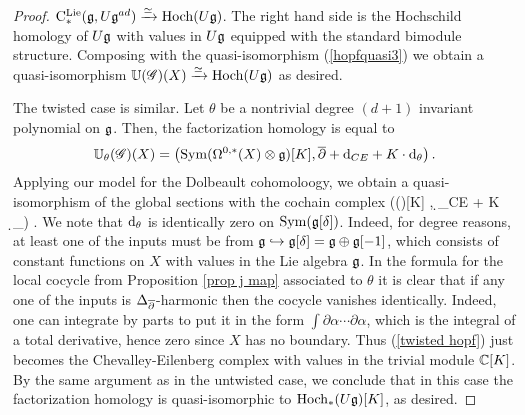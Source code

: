 \begin{proof}
\noindent${\rm C}^{\rm Lie}_*(\mathfrak g , U\mathfrak g^{ad}) \xrightarrow{\simeq} {\rm Hoch}(U\mathfrak g)$.
The right hand side is the Hochschild homology of $U\mathfrak g$ with values in $U\mathfrak g$ equipped with the standard bimodule structure. 
Composing with the quasi-isomorphism (\ref{hopfquasi3}) we obtain a quasi-isomorphism $\mathbb U(\mathscr G)(X) \xrightarrow{\simeq} {\rm Hoch}(U\mathfrak g)$ as desired.

The twisted case is similar. 
Let $\theta$ be a nontrivial degree $(d+1)$ invariant polynomial on $\mathfrak g$. 
Then, the factorization homology is equal to
\[
\mathbb U_\theta (\mathscr G)(X) = \left({\rm Sym}(\Omega^{0,*}(X) \otimes \mathfrak g)[K] , \overline{\partial} + {\rm d}_{CE} + K \cdot {\rm d}_\theta\right) .
\]
Applying our model for the Dolbeault cohomoloogy, we obtain a quasi-isomorphism of the global sections with the cochain complex
\beqn\label{twisted hopf}
\left(\Sym(\fg[\delta])[K] ,  \d_{CE} + K \cdot \d_\theta \right) .
\eeqn
We note that ${\rm d}_\theta$ is identically zero on ${\rm Sym}(\mathfrak g[\delta])$. 
Indeed, for degree reasons, at least one of the inputs must be from $\mathfrak g \hookrightarrow \mathfrak g[\delta] = \mathfrak g \oplus \mathfrak g[-1]$, which consists of constant functions on $X$ with values in the Lie algebra $\mathfrak g$. 
In the formula for the local cocycle from Proposition \ref{prop j map} associated to $\theta$ it is clear that if any one of the inputs is $\Delta_{\overline{\partial}}$-harmonic then the cocycle vanishes identically. 
Indeed, one can integrate by parts to put it in the form $\int \partial \alpha \cdots \partial \alpha$, which is the integral of a total derivative, hence zero since $X$ has no boundary.
Thus (\ref{twisted hopf}) just becomes the Chevalley-Eilenberg complex with values in the trivial module $\mathbb C[K]$. 
By the same argument as in the untwisted case, we conclude that in this case the factorization homology is quasi-isomorphic to ${\rm Hoch}_*(U \mathfrak g)[K]$, as desired.
\end{proof}

